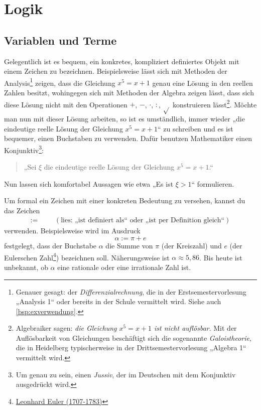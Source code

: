 

    

\chapter{Logik}


\section{Variablen und Terme}


\begin{nota} \label{zeichendefinieren}
    Gelegentlich ist es bequem, ein konkretes, kompliziert definiertes Objekt mit einem Zeichen zu bezeichnen. Beispielsweise lässt sich mit Methoden der Analysis\footnote{Genauer gesagt: der \emph{Differenzialrechnung}, die in der Erstsemestervorlesung „Analysis 1“ oder bereits in der Schule vermittelt wird. Siehe auch \cref{bsp:exverwendung}.} zeigen, dass die Gleichung $x^5=x+1$ genau eine Lösung in den reellen Zahlen besitzt, wohingegen sich mit Methoden der Algebra zeigen lässt, dass sich diese Lösung nicht mit den Operationen $+$, $-$, $\cdot$, $:$, $\sqrt{}$ konstruieren lässt\footnote{Algebraiker sagen: \emph{die Gleichung $x^5=x+1$ ist nicht auflösbar}. Mit der Auflösbarkeit von Gleichungen beschäftigt sich die sogenannte \emph{Galoistheorie}, die in Heidelberg typischerweise in der Drittsemestervorlesung „Algebra 1“ vermittelt wird.}. Möchte man nun mit dieser Lösung arbeiten, so ist es umständlich, immer wieder „die eindeutige reelle Lösung der Gleichung $x^5=x+1$“ zu schreiben und es ist bequemer, einen Buchstaben zu verwenden. Dafür benutzen Mathematiker einen Konjunktiv\footnote{Um genau zu sein, einen \emph{Jussiv}, der im Deutschen mit dem Konjunktiv ausgedrückt wird.}:
    \begin{quote}
        „Sei $\xi$ die eindeutige reelle Lösung der Gleichung $x^5=x+1$.“  
    \end{quote}
    Nun lassen sich komfortabel Aussagen wie etwa „Es ist $\xi>1$“ formulieren.
    
    Um formal ein Zeichen mit einer konkreten Bedeutung zu versehen, kannst du das Zeichen
    \begin{align*}
        := &&& (\text{lies: „ist definiert als“ oder „ist per Definition gleich“})
    \end{align*}
    verwenden. Beispielsweise wird im Ausdruck
        \[ \alpha:= \pi + e\]
    festgelegt, dass der Buchstabe $\alpha$ die Summe von $\pi$ (der Kreiszahl) und $e$ (der Eulerschen Zahl\footnote{\href{https://de.wikipedia.org/wiki/Leonhard_Euler}{Leonhard Euler (1707-1783)}}) bezeichnen soll. Näherungsweise ist $\alpha \approx 5{,}86$. Bis heute ist unbekannt, ob $\alpha$ eine rationale oder eine irrationale Zahl ist.
    

\end{nota}
